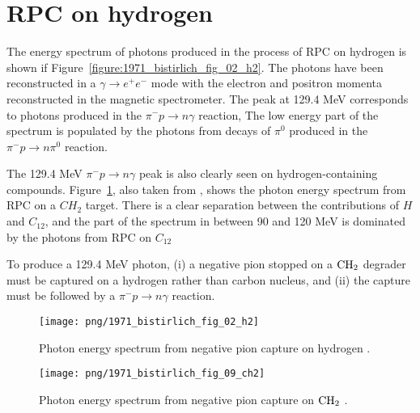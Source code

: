 \section{RPC on hydrogen}

The energy spectrum of photons produced in the process of RPC
on hydrogen \cite{RPC_1972_Bistirlich_PhysRevC.5.1867} is shown if Figure~\ref{figure:1971_bistirlich_fig_02_h2}.
The photons have been reconstructed in a $\gamma \to e^+e^-$
mode with the electron and positron momenta reconstructed in the magnetic spectrometer.
The peak at 129.4 MeV corresponds to photons produced in the $\pi^- p \to n \gamma$ reaction,
The low energy part of the spectrum is populated by the photons from decays of $\pi^0$ produced
in the $\pi^- p \to n \pi^0$ reaction. 

The 129.4 MeV $\pi^{-} p \to n \gamma$ peak is also clearly seen on hydrogen-containing compounds.
Figure~\ref{figure:1971_bistirlich_fig_09_ch2}, also taken from \cite{RPC_1972_Bistirlich_PhysRevC.5.1867},
shows the photon energy spectrum from RPC on a $CH_2$ target.
There is a clear separation between the contributions of $H$ and $C_{12}$,
and the part of the spectrum in between 90 and 120 MeV is dominated by the photons from RPC on $C_{12}$

To produce a 129.4 MeV photon,
(i) a negative pion stopped on a $\rm{CH_2}$  degrader must be captured
on a hydrogen rather than carbon nucleus, and
(ii) the capture must be followed by a $\pi^{-} p \to n \gamma$ reaction.

\begin{figure}[H]
 \begin{minipage}{.5\textwidth}
  \texttt{[image: png/1971\_bistirlich\_fig\_02\_h2]}
  \captionsetup{width=.8\linewidth}
  \caption[width=0.9\textwidth]{
      \label{figure:1971_bistirlich_fig_02_h2}
    Photon energy spectrum from negative pion capture on hydrogen \cite{RPC_1972_Bistirlich_PhysRevC.5.1867}.
    }
 \end{minipage}
 \begin{minipage}{.5\textwidth}
  \texttt{[image: png/1971\_bistirlich\_fig\_09\_ch2]}
  \captionsetup{width=.8\linewidth}
  \caption[width=0.9\textwidth]{
  \label{figure:1971_bistirlich_fig_09_ch2}
    Photon energy spectrum from negative pion capture on $\rm{CH_2}$ \cite{RPC_1972_Bistirlich_PhysRevC.5.1867}.
   }
 \end{minipage}
\end{figure}

